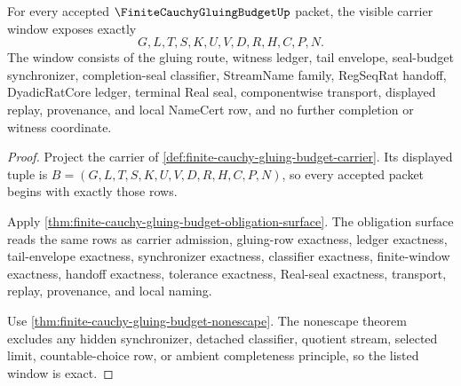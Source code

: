 \begin{theorem}
\label{thm:finite-cauchy-gluing-budget-carrier-window}
For every accepted $\FiniteCauchyGluingBudgetUp$ packet, the visible carrier window exposes exactly
$$
G,L,T,S,K,U,V,D,R,H,C,P,N .
$$
The window consists of the gluing route, witness ledger, tail envelope, seal-budget synchronizer, completion-seal classifier, StreamName family, RegSeqRat handoff, DyadicRatCore ledger, terminal Real seal, componentwise transport, displayed replay, provenance, and local NameCert row, and no further completion or witness coordinate.
\end{theorem}
\begin{proof}
Project the carrier of \autoref{def:finite-cauchy-gluing-budget-carrier}. Its displayed tuple is $B=(G,L,T,S,K,U,V,D,R,H,C,P,N)$, so every accepted packet begins with exactly those rows.

Apply \autoref{thm:finite-cauchy-gluing-budget-obligation-surface}. The obligation surface reads the same rows as carrier admission, gluing-row exactness, ledger exactness, tail-envelope exactness, synchronizer exactness, classifier exactness, finite-window exactness, handoff exactness, tolerance exactness, Real-seal exactness, transport, replay, provenance, and local naming.

Use \autoref{thm:finite-cauchy-gluing-budget-nonescape}. The nonescape theorem excludes any hidden synchronizer, detached classifier, quotient stream, selected limit, countable-choice row, or ambient completeness principle, so the listed window is exact.
\end{proof}

